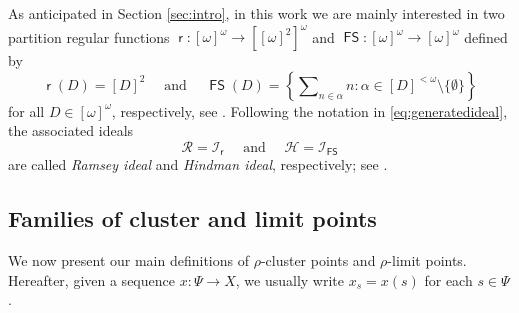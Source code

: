 \documentclass{amsart}
\theoremstyle{plain}
\theoremstyle{definition}
\theoremstyle{remark}
\newcommand{\cI}{\mathcal{I}}
\newcommand{\I}{\cI}
\DeclareMathOperator{\FS}{\mathsf{FS}}
\DeclareMathOperator{\rr}{\mathsf{r}}
\begin{document}
As anticipated in Section \ref{sec:intro}, in this work we are mainly interested in two partition regular functions $\rr:[\omega]^\omega\to[[\omega]^2]^\omega$ and $\FS:[\omega]^\omega\to[\omega]^\omega$ defined by 
\begin{equation*}
\rr(D)=[D]^2
\quad \text{ and }\quad 
\FS(D)=\left\{ \sum\nolimits_{n\in\alpha}n:\alpha\in[D]^{<\omega}\setminus\{\emptyset\}\right\}
\end{equation*}
for all $D \in [\omega]^\omega$, respectively, see \cite[Theorem 3.4 and Theorem 3.6]{FKK23}. 
Following the notation in \eqref{eq:generatedideal}, the associated ideals
\begin{equation*}
\mathcal{R}=\I_{\rr}
\quad \text{ and }\quad 
\mathcal{H}=\I_{\FS}
\end{equation*}
are called \emph{Ramsey ideal} and \emph{Hindman ideal}, respectively; see \cite{MR2471564, MR3019575, alcantara-phd-thesis}. 


\subsection{Families of cluster and limit points} We now present our main definitions of $\rho$-cluster points and $\rho$-limit points. Hereafter, given a sequence $x: \Psi\to X$, we usually write $x_s=x(s)$ for each $s \in \Psi$. 
\end{document}
